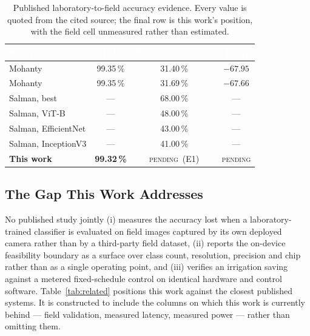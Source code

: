 \documentclass[journal]{IEEEtran}
\newcommand{\hd}[1]{\textcolor{white}{\textbf{#1}}}
\newcommand{\tbd}{\textcolor{warnred}{\textsc{pending}}}
\begin{document}
\begin{table}[t]
\centering
\caption{Published laboratory-to-field accuracy evidence. Every value is
quoted from the cited source; the final row is this work's position, with
the field cell unmeasured rather than estimated.}
\label{tab:gap}
\footnotesize
\setlength{\tabcolsep}{4pt}
\begin{tabular}{p{2.45cm}ccc}
\rowcolor{hdr}
\hd{Study} & \hd{Lab} & \hd{Field / cross-dom.} & \hd{Drop} \\
\midrule
\rowcolor{rowlite}
Mohanty \cite{mohanty2016deep} & 99.35\,\% & 31.40\,\% & $-67.95$ \\
Mohanty \cite{mohanty2016deep} & 99.35\,\% & 31.69\,\% & $-67.66$ \\
\rowcolor{rowlite}
Salman, best \cite{salman2025plantdisease} & --- & 68.00\,\% & --- \\
Salman, ViT-B \cite{salman2025plantdisease} & --- & 48.00\,\% & --- \\
\rowcolor{rowlite}
Salman, EfficientNet \cite{salman2025plantdisease} & --- & 43.00\,\% & --- \\
Salman, InceptionV3 \cite{salman2025plantdisease} & --- & 41.00\,\% & --- \\
\rowcolor{pend}
\textbf{This work} & \textbf{99.32\,\%} & \tbd\ (E1) & \tbd \\
\bottomrule
\end{tabular}
\end{table}

\subsection{The Gap This Work Addresses}

No published study jointly (i) measures the accuracy lost when a
laboratory-trained classifier is evaluated on field images captured by its
own deployed camera rather than by a third-party field dataset, (ii)
reports the on-device feasibility boundary as a surface over class count,
resolution, precision and chip rather than as a single operating point, and
(iii) verifies an irrigation saving against a metered fixed-schedule
control on identical hardware and control software. Table~\ref{tab:related}
positions this work against the closest published systems. It is
constructed to include the columns on which this work is currently behind
--- field validation, measured latency, measured power --- rather than
omitting them.
\end{document}
